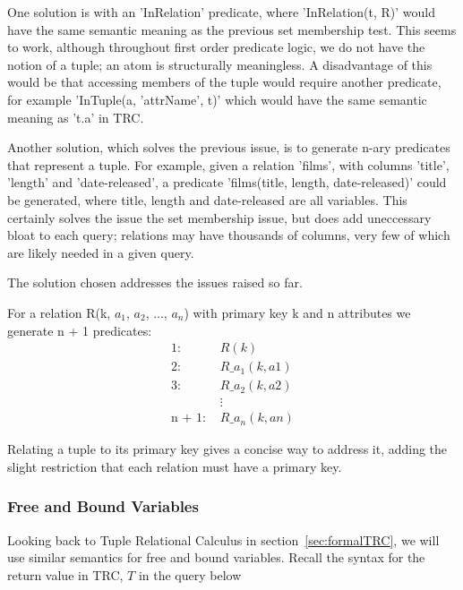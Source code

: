 \documentclass[a4paper, 11pt]{article}
\begin{document}
      One solution is with an 'InRelation' predicate, where 'InRelation(t, R)'
      would have the same semantic meaning as the previous set membership test.
      This seems to work, although throughout first order predicate logic, we
      do not have the notion of a tuple; an atom is structurally meaningless. A
      disadvantage of this would be that accessing members of the tuple would
      require another predicate, for example 'InTuple(a, 'attrName', t)' which
      would have the same semantic meaning as 't.a' in TRC.

      Another solution, which solves the previous issue, is to generate n-ary
      predicates that represent a tuple. For example, given a relation 'films',
      with columns 'title', 'length' and 'date-released', a predicate
      'films(title, length, date-released)' could be generated, where title,
      length and date-released are all variables. This certainly solves the
      issue the set membership issue, but does add uneccessary bloat to each
      query; relations may have thousands of columns, very few of which are
      likely needed in a given query.

      The solution chosen addresses the issues raised so far.

      For a relation R(k, $a_{1}$, $a_{2}$, ..., $a_{n}$) with primary key k
      and n attributes we generate n + 1 predicates:
      \begin{align*}
        \text{1:  }     & R(k)            \\
        \text{2:  }     & R\_a_1(k, a1)   \\
        \text{3:  }     & R\_a_2(k, a2)   \\
                        & \vdots          \\
        \text{n + 1:  }  & R\_a_n(k, an)
      \end{align*}

      Relating a tuple to its primary key gives a concise way to address it,
      adding the slight restriction that each relation must have a primary key.

    \subsubsection{Free and Bound Variables}
    \label{sec:freebound}

      Looking back to Tuple Relational Calculus in
      section~\ref{sec:formalTRC}, we will use similar semantics for free and
      bound variables. Recall the syntax for the return value in TRC, $T$ in the
      query below
\end{document}
